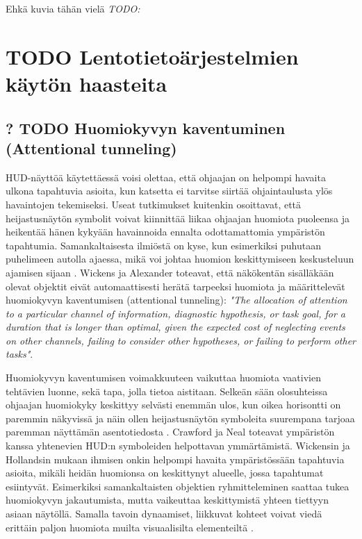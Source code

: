 \documentclass[utf8,bachelor,manualbib]{gradu3}
\begin{document}
Ehkä kuvia tähän vielä \citep{schnellym2004} \emph{TODO:}

\chapter{TODO Lentotietoärjestelmien käytön haasteita}

\section{? TODO Huomiokyvyn kaventuminen (Attentional tunneling)}

HUD-näyttöä käytettäessä voisi olettaa, että ohjaajan on helpompi havaita ulkona tapahtuvia asioita, kun katsetta ei tarvitse siirtää ohjaintaulusta ylös havaintojen tekemiseksi. Useat tutkimukset \citep{fischerym1980, kimkaber2014, weintraubensing1992, wickenslong1995, wickensalexander2009} kuitenkin osoittavat, että heijastusnäytön symbolit voivat kiinnittää liikaa ohjaajan huomiota puoleensa ja heikentää hänen kykyään havainnoida ennalta odottamattomia ympäristön tapahtumia. Samankaltaisesta ilmiöstä on kyse, kun esimerkiksi puhutaan puhelimeen autolla ajaessa, mikä voi johtaa huomion keskittymiseen keskusteluun ajamisen sijaan \citep{horreywickens2006, strayerdrews2007, strayerym2001}. Wickens ja Alexander \citeyearpar{wickensalexander2009} toteavat, että näkökentän sisälläkään olevat objektit eivät automaattisesti herätä tarpeeksi huomiota ja määrittelevät huomiokyvyn kaventumisen (attentional tunneling): \emph{"The allocation of attention to a particular channel of information, diagnostic hypothesis, or task goal, for a duration that is longer than optimal, given the expected cost of neglecting events on other channels, failing to consider other hypotheses, or failing to perform other tasks"}.

Huomiokyvyn kaventumisen voimakkuuteen vaikuttaa huomiota vaativien tehtävien luonne, sekä tapa, jolla tietoa aistitaan. Selkeän sään olosuhteissa ohjaajan huomiokyky keskittyy selvästi enemmän ulos, kun oikea horisontti on paremmin näkyvissä ja näin ollen heijastusnäytön symboleita suurempana tarjoaa paremman näyttämän asentotiedosta \citep{ververswickens1998}. Crawford ja Neal \citeyearpar{crawfordneal2006} toteavat ympäristön kanssa yhtenevien HUD:n symboleiden helpottavan ymmärtämistä. Wickensin ja Hollandsin mukaan \citeyearpar{wickenshollands2000} ihmisen onkin helpompi havaita ympäristössään tapahtuvia asioita, mikäli heidän huomionsa on keskittynyt alueelle, jossa tapahtumat esiintyvät. Esimerkiksi samankaltaisten objektien ryhmitteleminen saattaa tukea huomiokyvyn jakautumista, mutta vaikeuttaa keskittymistä yhteen tiettyyn asiaan näytöllä. Samalla tavoin dynaamiset, liikkuvat kohteet voivat viedä erittäin paljon huomiota muilta visuaalisilta elementeiltä \citep{crawfordneal2006}.
\end{document}
